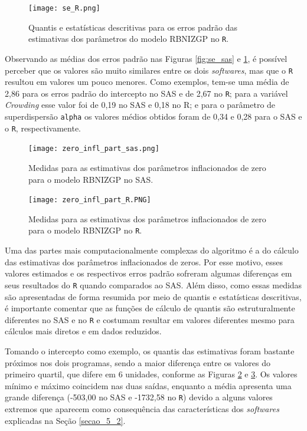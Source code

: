 \documentclass[12pt, a4paper, twoside]{report}
\numberwithin{equation}{section} %
\begin{document}
\begin{figure}[!htb]
    \centering
    \texttt{[image: se\_R.png]}
    \caption{Quantis e estatísticas descritivas para os erros padrão das estimativas dos parâmetros do modelo RBNIZGP no \texttt{R}.}
\label{fig:se_R}
\end{figure}

Observando as médias dos erros padrão nas Figuras \ref{fig:se_sas} e \ref{fig:se_R}, é possível perceber que os valores são muito similares entre os dois \textit{softwares}, mas que o \texttt{R} resultou em valores um pouco menores. Como exemplos, tem-se uma média de 2,86 para os erros padrão do intercepto no SAS e de 2,67 no \texttt{R}; para a variável \textit{Crowding} esse valor foi de 0,19 no SAS e 0,18 no R; e para o parâmetro de superdispersão \texttt{alpha} os valores médios obtidos foram de 0,34 e 0,28 para o SAS e o \texttt{R}, respectivamente.


\begin{figure}[!htb]
    \centering
    \texttt{[image: zero\_infl\_part\_sas.png]}
    \caption{Medidas para as estimativas dos parâmetros inflacionados de zero para o modelo RBNIZGP no SAS.}
\label{fig:zero_infl_part_sas}
\end{figure}

\begin{figure}[!htb]
    \centering
    \texttt{[image: zero\_infl\_part\_R.PNG]}
    \caption{Medidas para as estimativas dos parâmetros inflacionados de zero para o modelo RBNIZGP no \texttt{R}.}
\label{fig:zero_infl_part_R}
\end{figure}

Uma das partes mais computacionalmente complexas do algoritmo é a do cálculo das estimativas dos parâmetros inflacionados de zeros. Por esse motivo, esses valores estimados e os respectivos erros padrão sofreram algumas diferenças em seus resultados do \texttt{R} quando comparados ao SAS. Além disso, como essas medidas são apresentadas de forma resumida por meio de quantis e estatísticas descritivas, é importante comentar que as funções de cálculo de quantis são estruturalmente diferentes no SAS e no \texttt{R} e costumam resultar em valores diferentes mesmo para cálculos mais diretos e em dados reduzidos.

Tomando o intercepto como exemplo, os quantis das estimativas foram bastante próximos nos dois programas, sendo a maior diferença entre os valores do primeiro quartil, que difere em 6 unidades, conforme as Figuras \ref{fig:zero_infl_part_sas} e \ref{fig:zero_infl_part_R}. Os valores mínimo e máximo coincidem nas duas saídas, enquanto a média apresenta uma grande diferença (-503,00 no SAS e -1732,58 no \texttt{R}) devido a alguns valores extremos que aparecem como consequência das características dos \textit{softwares} explicadas na Seção \ref{secao_5_2}.
\end{document}
